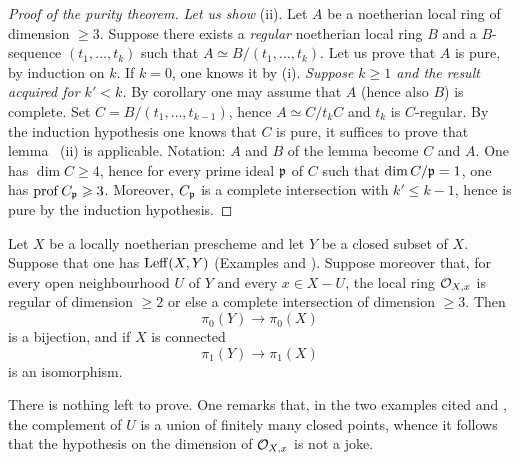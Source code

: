 \begin{proof}[Proof of the purity theorem]
\emph{Let us show} (ii). Let $A$ be a noetherian local ring of
dimension $\geq 3$. Suppose there exists a \emph{regular} noetherian
local ring $B$ and a $B$-sequence $(t_1, \ldots, t_k)$ such that
$A\simeq B/(t_1, \ldots, t_k)$. Let us prove that $A$ is pure, by
induction on $k$. If $k=0$, one knows it by (i). \emph{Suppose
$k\geq1$ and the result acquired for $k'<k$.} By corollary
 one may assume that $A$ (hence also $B$) is complete. Set
$C=B/(t_1, \ldots, t_{k-1})$, hence $A\simeq C/t_kC$ and $t_k$ is
$C$-regular. By the induction hypothesis one knows that $C$ is pure, it
suffices to prove that lemma ~(ii) is applicable. Notation:
$A$ and $B$ of the lemma become $C$ and $A$. One has $\dim C\geq4$,
hence for every prime ideal $\mathfrak{p}$ of $C$ such that $\dim C/\mathfrak{p}=1$, one
has $\operatorname{prof} C_{\mathfrak{p}}\geqslant3$. Moreover, $C_{\mathfrak{p}}$ is a complete intersection
with $k'\leq k-1$, hence is pure by the induction hypothesis.
\end{proof}

\begin{theorem} \label{X.3.10}
Let $X$ be a locally noetherian prescheme and let $Y$ be a closed
subset of $X$. Suppose that one has $\operatorname{Leff}(X, Y)$ (\cf Examples
 and ). Suppose moreover that, for every open
neighbourhood $U$ of $Y$ and every $x\in X-U$, the local ring
${\mathcal O}_{X, x}$ is regular of dimension $\geq2$ or else a complete
intersection of dimension $\geq3$. Then
\[
\pi_0(Y) \to \pi_0(X)
\]
is a bijection, and if $X$ is connected
\[
\pi_1(Y) \to \pi_1(X)
\]
is an isomorphism.
\end{theorem}

There is nothing left to prove. One remarks that, in the two examples
cited  and , the complement of $U$ is a union of
finitely many closed points, whence it follows that the hypothesis on
the dimension of ${\mathcal O}_{X, x}$ is not a joke.

